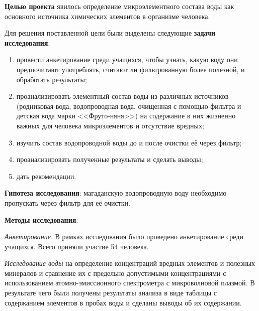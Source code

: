 


\makeProcTitleSchool


\textbf{Целью проекта} явилось определение микроэлементного состава воды как основного источника химических элементов в организме человека.

Для решения поставленной цели были выделены следующие \textbf{задачи исследования}:
\begin{enumerate}[noitemsep]\vspace{-8pt}
\item провести анкетирование среди учащихся, чтобы узнать, какую воду они предпочитают употреблять, считают ли фильтрованную более полезной, и обработать результаты;
\item проанализировать элементный состав воды из различных источников (родниковая вода, водопроводная вода, очищенная с помощью фильтра и детская вода марки <<Фруто-няня>>) на содержание в них жизненно важных для человека микроэлементов и отсутствие вредных;
\item изучить состав водопроводной воды до и после очистки её через фильтр;
\item проанализировать полученные результаты и сделать выводы;
\item дать рекомендации.
\end{enumerate}\vspace{-8pt}

\textbf{Гипотеза исследования}: магаданскую водопроводную воду необходимо пропускать через фильтр для её очистки.

\textbf{Методы исследования}:

\textit{Анкетирование}. В рамках исследования было проведено анкетирование среди учащихся. Всего приняли участие 54 человека.

\textit{Исследование воды} на определение концентраций вредных элементов и полезных минералов и сравнение их с предельно допустимыми концентрациями с использованием атомно-эмиссионного спектрометра с микроволновой плазмой. В результате чего были получены результаты анализа в виде таблицы с содержанием элементов в пробах воды и сделаны выводы об их содержании.

